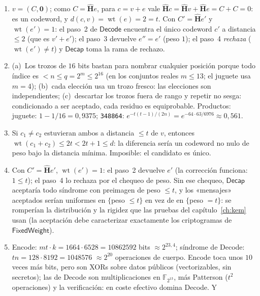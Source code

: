 \documentclass[11pt,a4paper,oneside]{report}
\newcommand{\GF}[1]{\mathbb{F}_{#1}}
\newcommand{\wt}{\operatorname{wt}}
\newcommand{\Hmat}{\mathbf{H}}          %
\begin{document}
\begin{enumerate}[leftmargin=1.9em,itemsep=4pt]
  \item $v=(C,\mathbf{0})$; como $C=\hat{\Hmat}e$, para $c=v+e$
        vale $\hat{\Hmat}c=\hat{\Hmat}v+\hat{\Hmat}e=C+C=0$: es un
        codeword, y $d(c,v)=\wt(e)=2=t$. Con $C'=\hat{\Hmat}e'$ y
        $\wt(e')=1$: el paso~2 de $\textsf{Decode}$ encuentra el
        único codeword $c'$ a distancia $\le2$ (que es $v' + e'$);
        el paso~3 devuelve $e''=e'$ (peso $1$); el paso~4
        \emph{rechaza} ($\wt(e')\ne t$) y $\textsf{Decap}$ toma la
        rama de rechazo.
  \item (a)~Los trozos de $16$ bits bastan para nombrar cualquier
        posición porque todo índice es $<n\le q=2^m\le2^{16}$ (en
        los conjuntos reales $m\le13$; el juguete usa $m=4$);
        (b)~cada
        elección usa un trozo fresco: las elecciones son
        independientes; (c)~descartar los trozos fuera de rango y
        repetir no sesga: condicionado a ser aceptado, cada residuo
        es equiprobable. Productos: juguete:
        $1-1/16=0{,}9375$; \texttt{348864}:
        $e^{-t(t-1)/(2n)}=e^{-64\cdot63/6976}\approx0{,}561$.
  \item Si $c_1\ne c_2$ estuvieran ambos a distancia $\le t$ de
        $v$, entonces $\wt(c_1+c_2)\le2t<2t+1\le d$: la diferencia
        sería un codeword no nulo de peso bajo la distancia mínima.
        Imposible: el candidato es único.
  \item Con $C'=\hat{\Hmat}e'$, $\wt(e')=1$: el paso~2 devuelve
        $e'$ (la corrección funciona: $1\le t$); el paso~4 lo
        rechaza por el chequeo de peso. Sin ese chequeo,
        $\textsf{Decap}$ aceptaría todo síndrome con preimagen de
        peso $\le t$, y los «mensajes» aceptados serían uniformes en
        $\{$peso $\le t\}$ en vez de en $\{$peso $=t\}$: se
        romperían la distribución y la rigidez que las pruebas del
        capítulo~\ref{ch:kem} usan (la aceptación debe caracterizar
        exactamente los criptogramas de $\textsf{FixedWeight}$).
  \item \textsf{Encode}: $mt\cdot k=1664\cdot6528=\num{10862592}$
        bits $\approx2^{23{,}4}$; síndrome de \textsf{Decode}:
        $tn=128\cdot8192=\num{1048576}$ $\approx2^{20}$ operaciones
        de cuerpo. \textsf{Encode} toca unos $10$ veces más bits,
        pero son XORs sobre datos públicos (vectorizables, sin
        secretos); las de \textsf{Decode} son multiplicaciones en
        $\GF{2^{13}}$, más Patterson ($t^2$ operaciones) y la
        verificación: en coste efectivo domina \textsf{Decode}. Y

\end{enumerate}
\end{document}
